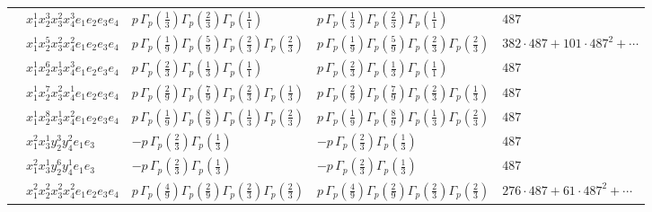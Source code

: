 \documentclass[11pt]{article}
\begin{document}
\begin{table}[ht]
{\begin{tabular}{@{}lllll@{}}
 & $x_{1}^{1} x_{2}^{3} x_{3}^{2} x_{4}^{3}  e_{1} e_{2} e_{3} e_{4}$ & $p \, \Gamma_p \left( \frac{1}{3} \right) \Gamma_p \left( \frac{2}{3} \right) \Gamma_p \left( \frac{1}{1} \right)$ & $p \, \Gamma_p \left( \frac{1}{3} \right) \Gamma_p \left( \frac{2}{3} \right) \Gamma_p \left( \frac{1}{1} \right)$ & $487$ \\
 & $x_{1}^{1} x_{2}^{5} x_{3}^{2} x_{4}^{2}  e_{1} e_{2} e_{3} e_{4}$ & $p \, \Gamma_p \left( \frac{1}{9} \right) \Gamma_p \left( \frac{5}{9} \right) \Gamma_p \left( \frac{2}{3} \right) \Gamma_p \left( \frac{2}{3} \right)$ & $p \, \Gamma_p \left( \frac{1}{9} \right) \Gamma_p \left( \frac{5}{9} \right) \Gamma_p \left( \frac{2}{3} \right) \Gamma_p \left( \frac{2}{3} \right)$ & $382{\cdot}487{+}101{\cdot}487^{2}{+}\cdots$ \\
 & $x_{1}^{1} x_{2}^{6} x_{3}^{1} x_{4}^{3}  e_{1} e_{2} e_{3} e_{4}$ & $p \, \Gamma_p \left( \frac{2}{3} \right) \Gamma_p \left( \frac{1}{3} \right) \Gamma_p \left( \frac{1}{1} \right)$ & $p \, \Gamma_p \left( \frac{2}{3} \right) \Gamma_p \left( \frac{1}{3} \right) \Gamma_p \left( \frac{1}{1} \right)$ & $487$ \\
 & $x_{1}^{1} x_{2}^{7} x_{3}^{2} x_{4}^{1}  e_{1} e_{2} e_{3} e_{4}$ & $p \, \Gamma_p \left( \frac{2}{9} \right) \Gamma_p \left( \frac{7}{9} \right) \Gamma_p \left( \frac{2}{3} \right) \Gamma_p \left( \frac{1}{3} \right)$ & $p \, \Gamma_p \left( \frac{2}{9} \right) \Gamma_p \left( \frac{7}{9} \right) \Gamma_p \left( \frac{2}{3} \right) \Gamma_p \left( \frac{1}{3} \right)$ & $487$ \\
 & $x_{1}^{1} x_{2}^{8} x_{3}^{1} x_{4}^{2}  e_{1} e_{2} e_{3} e_{4}$ & $p \, \Gamma_p \left( \frac{1}{9} \right) \Gamma_p \left( \frac{8}{9} \right) \Gamma_p \left( \frac{1}{3} \right) \Gamma_p \left( \frac{2}{3} \right)$ & $p \, \Gamma_p \left( \frac{1}{9} \right) \Gamma_p \left( \frac{8}{9} \right) \Gamma_p \left( \frac{1}{3} \right) \Gamma_p \left( \frac{2}{3} \right)$ & $487$ \\
 & $x_{1}^{2} x_{3}^{1} y_{2}^{3} y_{4}^{2} e_{1} e_{3}$ & $- p \, \Gamma_p \left( \frac{2}{3} \right) \Gamma_p \left( \frac{1}{3} \right)$ & $- p \, \Gamma_p \left( \frac{2}{3} \right) \Gamma_p \left( \frac{1}{3} \right)$ & $487$ \\
 & $x_{1}^{2} x_{3}^{1} y_{2}^{6} y_{4}^{1} e_{1} e_{3}$ & $- p \, \Gamma_p \left( \frac{2}{3} \right) \Gamma_p \left( \frac{1}{3} \right)$ & $- p \, \Gamma_p \left( \frac{2}{3} \right) \Gamma_p \left( \frac{1}{3} \right)$ & $487$ \\
 & $x_{1}^{2} x_{2}^{2} x_{3}^{2} x_{4}^{2}  e_{1} e_{2} e_{3} e_{4}$ & $p \, \Gamma_p \left( \frac{4}{9} \right) \Gamma_p \left( \frac{2}{9} \right) \Gamma_p \left( \frac{2}{3} \right) \Gamma_p \left( \frac{2}{3} \right)$ & $p \, \Gamma_p \left( \frac{4}{9} \right) \Gamma_p \left( \frac{2}{9} \right) \Gamma_p \left( \frac{2}{3} \right) \Gamma_p \left( \frac{2}{3} \right)$ & $276{\cdot}487{+}61{\cdot}487^{2}{+}\cdots$ \\

\end{tabular}}
\end{table}
\end{document}
